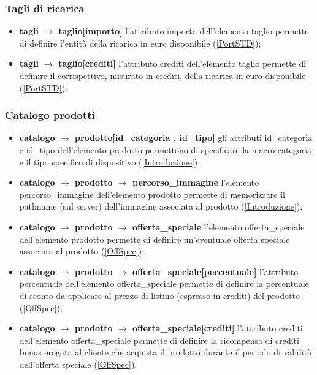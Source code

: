 \documentclass[a4paper, 14pt]{article}
\begin{document}
\begin{flushleft}
			\subsubsection{Tagli di ricarica} 
				\begin{itemize}
					\item \textbf{tagli $\rightarrow$ taglio[importo] } l'attributo importo dell'elemento taglio 
					permette di definire l'entità della ricarica in euro disponibile (\ref{PortSTD});
					\item \textbf{tagli $\rightarrow$ taglio[crediti] } l'attributo crediti dell'elemento taglio 
					permette di definire il corrispettivo, misurato in crediti, della ricarica in euro disponibile (\ref{PortSTD}).
				\end{itemize}
			\smallskip
			\subsubsection{Catalogo prodotti} 
				\begin{itemize}
					\item \textbf{catalogo $\rightarrow$ prodotto[id\_categoria , id\_tipo] } gli attributi id\_categoria e id\_tipo dell'elemento prodotto permettono di specificare la macro-categoria e il tipo specifico di dispositivo (\ref{Introduzione});
					\item \textbf{catalogo $\rightarrow$ prodotto $\rightarrow$ percorso\_immagine } l'elemento percorso\_immagine dell'elemento prodotto permette di memorizzare il pathname (sul server) dell'immagine associata al prodotto
					(\ref{Introduzione});
					\item \textbf{catalogo $\rightarrow$ prodotto $\rightarrow$ offerta\_speciale } l'elemento offerta\_speciale dell'elemento prodotto permette di definire un'eventuale offerta speciale associata al prodotto
					(\ref{OffSpec});
					\item \textbf{catalogo $\rightarrow$ prodotto $\rightarrow$ offerta\_speciale[percentuale] } l'attributo percentuale dell'elemento offerta\_speciale permette di definire la percentuale di sconto da applicare al prezzo di listino (espresso in crediti) del prodotto (\ref{OffSpec});
					\item \textbf{catalogo $\rightarrow$ prodotto $\rightarrow$ offerta\_speciale[crediti] } l'attributo crediti dell'elemento offerta\_speciale permette di definire la ricompensa di crediti bonus erogata al cliente che acquista il prodotto durante il periodo di validità dell'offerta speciale (\ref{OffSpec}).
				\end{itemize}
			\smallskip
			

\end{flushleft}
\end{document}
